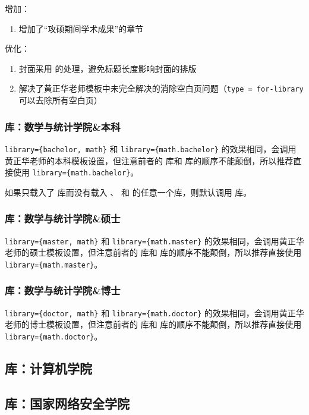 增加：
\begin{enumerate}
  \item 增加了“攻硕期间学术成果”的章节
\end{enumerate}

优化：
\begin{enumerate}
  \item 封面采用  的处理，避免标题长度影响封面的排版
  \item 解决了黄正华老师模板中未完全解决的消除空白页问题（\verb|type = for-library| 可以去除所有空白页）
\end{enumerate}


\subsubsection{ 库：数学与统计学院\&本科}

\verb|library={bachelor, math}| 和 \verb|library={math.bachelor}| 的效果相同，会调用黄正华老师的本科模板设置，但注意前者的  库和  库的顺序不能颠倒，所以推荐直接使用 \verb|library={math.bachelor}|。

如果只载入了  库而没有载入 、 和  的任意一个库，则默认调用  库。


\subsubsection{ 库：数学与统计学院\&硕士}


\verb|library={master, math}| 和 \verb|library={math.master}| 的效果相同，会调用黄正华老师的硕士模板设置，但注意前者的  库和  库的顺序不能颠倒，所以推荐直接使用 \verb|library={math.master}|。


\subsubsection{ 库：数学与统计学院\&博士}


\verb|library={doctor, math}| 和 \verb|library={math.doctor}| 的效果相同，会调用黄正华老师的博士模板设置，但注意前者的  库和  库的顺序不能颠倒，所以推荐直接使用 \verb|library={math.doctor}|。

\subsection{ 库：计算机学院}


\subsection{ 库：国家网络安全学院}